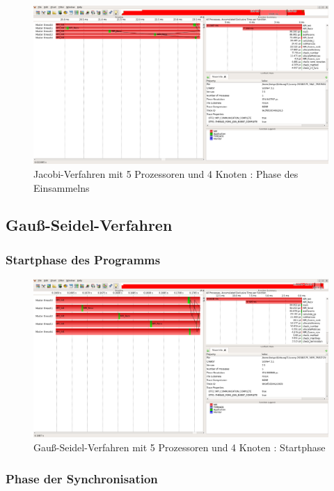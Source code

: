 \documentclass[11pt,a4paper]{article}
\begin{document}
\begin{figure}[htbp] %
   \centering
   \includegraphics[width=1\textwidth]{Jacobi_1_4nodes.png} 
   \caption{Jacobi-Verfahren mit 5 Prozessoren und 4 Knoten : Phase des Einsammelns}
   \label{Jacobi_3_4nodes}
\end{figure}

\subsection{Gauß-Seidel-Verfahren}

\subsubsection{Startphase des Programms}
\begin{figure}[htbp] %
   \centering
   \includegraphics[width=1\textwidth]{Seidel_1_4nodes.png} 
   \caption{Gauß-Seidel-Verfahren mit 5 Prozessoren und 4 Knoten : Startphase}
   \label{Seidel_1_4nodes}
\end{figure}

\subsubsection{Phase der Synchronisation}
\end{document}
